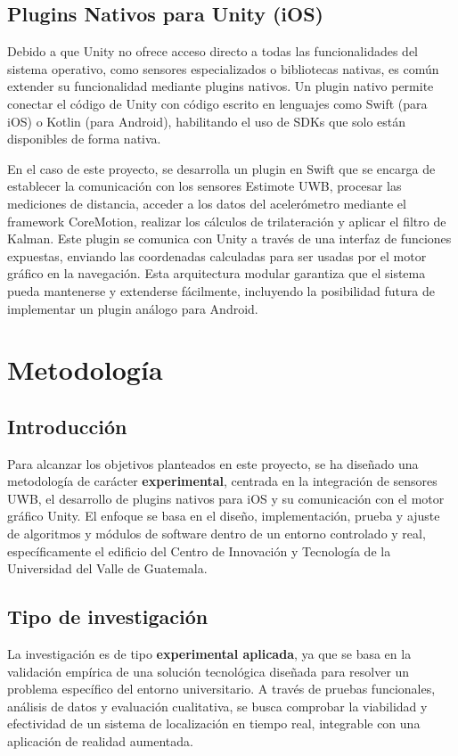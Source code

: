 \documentclass{article}
\begin{document}
\subsection{Plugins Nativos para Unity (iOS)}
{\justify Debido a que Unity no ofrece acceso directo a todas las funcionalidades del sistema operativo, como sensores especializados o bibliotecas nativas, es común extender su funcionalidad mediante plugins nativos. Un plugin nativo permite conectar el código de Unity con código escrito en lenguajes como Swift (para iOS) o Kotlin (para Android), habilitando el uso de SDKs que solo están disponibles de forma nativa.

En el caso de este proyecto, se desarrolla un plugin en Swift que se encarga de establecer la comunicación con los sensores Estimote UWB, procesar las mediciones de distancia, acceder a los datos del acelerómetro mediante el framework CoreMotion, realizar los cálculos de trilateración y aplicar el filtro de Kalman. Este plugin se comunica con Unity a través de una interfaz de funciones expuestas, enviando las coordenadas calculadas para ser usadas por el motor gráfico en la navegación. Esta arquitectura modular garantiza que el sistema pueda mantenerse y extenderse fácilmente, incluyendo la posibilidad futura de implementar un plugin análogo para Android.}
\newpage

\section{Metodología}
\subsection{Introducción}


Para alcanzar los objetivos planteados en este proyecto, se ha diseñado una metodología de carácter \textbf{experimental}, centrada en la integración de sensores UWB, el desarrollo de plugins nativos para iOS y su comunicación con el motor gráfico Unity. El enfoque se basa en el diseño, implementación, prueba y ajuste de algoritmos y módulos de software dentro de un entorno controlado y real, específicamente el edificio del Centro de Innovación y Tecnología de la Universidad del Valle de Guatemala.

\subsection{Tipo de investigación}

La investigación es de tipo \textbf{experimental aplicada}, ya que se basa en la validación empírica de una solución tecnológica diseñada para resolver un problema específico del entorno universitario. A través de pruebas funcionales, análisis de datos y evaluación cualitativa, se busca comprobar la viabilidad y efectividad de un sistema de localización en tiempo real, integrable con una aplicación de realidad aumentada.
\end{document}
